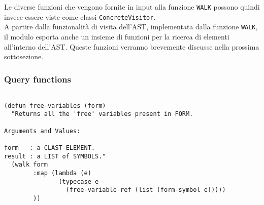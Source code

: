 Le diverse funzioni che vengono fornite in input alla funzione \texttt{WALK}
possono quindi invece essere viste come classi \texttt{ConcreteVisitor}.\\


A partire dalla funzionalità di visita dell'AST, implementata dalla funzione
\texttt{WALK}, il modulo esporta anche un insieme di funzioni per la ricerca di
elementi all'interno dell'AST. Queste funzioni verranno brevemente discusse
nella prossima sottosezione.

\subsubsection{Query functions}

\begin{lstlisting}[caption=Query functions per l'identificazione di variabili
libere all'interno di una form Common Lisp]

(defun free-variables (form)
  "Returns all the 'free' variables present in FORM.

Arguments and Values:

form   : a CLAST-ELEMENT.
result : a LIST of SYMBOLS."
  (walk form
        :map (lambda (e)
               (typecase e
                 (free-variable-ref (list (form-symbol e)))))
        ))

\end{lstlisting}





